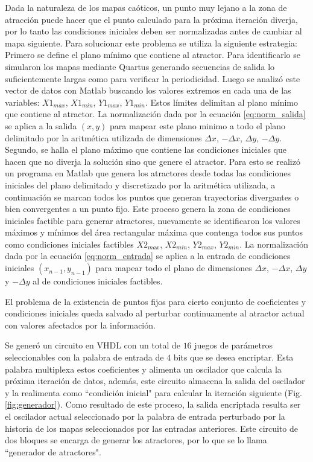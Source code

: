 Dada la naturaleza de los mapas caóticos, un punto muy lejano a la zona de atracción puede hacer que el punto calculado para la próxima iteración diverja, por lo tanto las condiciones iniciales deben ser normalizadas antes de cambiar al mapa siguiente. Para solucionar este problema se utiliza la siguiente estrategia:
 Primero se define el plano mínimo que contiene al atractor. Para
        identificarlo se simularon los mapas mediante Quartus
        generando secuencias de salida lo suficientemente largas como para
        verificar la periodicidad. Luego se analizó este vector de datos
        con Matlab buscando los valores extremos en cada una de las
        variables: $X1_{max}$, $X1_{min}$, $Y1_{max}$, $Y1_{min}$. Estos límites delimitan al plano mínimo que contiene al atractor. La normalización dada por la ecuación \ref{eq:norm_salida} se aplica a la salida $\left(x,y\right)$ para mapear este plano minimo a todo el plano delimitado por la aritmética utilizada de dimensiones $\Delta x$, $-\Delta x$, $\Delta y$, $-\Delta y$.
Segundo, se halla el plano máximo que contiene las condiciones
iniciales que hacen que no diverja la solución sino que genere el
atractor. Para esto se realizó un programa en Matlab que genera
los atractores desde todas las condiciones iniciales del plano
delimitado y discretizado por la aritmética utilizada, a
continuación se marcan todos los puntos que generan trayectorias
divergantes o bien convergentes a un punto fijo. Este proceso
genera la zona de condiciones iniciales factible para generar
atractores, nuevamente se identificaron los valores máximos y
mínimos del área rectangular máxima que contenga todos sus puntos
como condiciones iniciales factibles $X2_{max}$, $X2_{min}$,
$Y2_{max}$, $Y2_{min}$. La normalización dada por la ecuación
\ref{eq:norm_entrada} se aplica a la entrada de condiciones
iniciales $\left(x_{n-1},y_{n-1}\right)$ para mapear todo el plano
de dimensiones $\Delta x$, $-\Delta x$, $\Delta y$ y $-\Delta y$
al de condiciones iniciales factibles.


El problema de la existencia de puntos fijos para cierto conjunto de
coeficientes y condiciones iniciales queda salvado al perturbar
continuamente al atractor actual con valores afectados por la
información.

Se generó un circuito en VHDL con un total de $16$ juegos de
parámetros seleccionables con la palabra de entrada de $4$ bits
que se desea encriptar. Esta palabra multiplexa estos coeficientes
y alimenta un oscilador que calcula la próxima iteración de datos,
además, este circuito almacena la salida del oscilador y la
realimenta como ``condición inicial" para calcular la iteración
siguiente (Fig. \ref{fig:generador}). Como resultado de este
proceso, la salida encriptada resulta ser el oscilador actual
seleccionado por la palabra de entrada perturbado por la historia
de los mapas seleccionados por las entradas anteriores. Este
circuito de dos bloques se encarga de generar los atractores, por
lo que se lo llama ``generador de atractores".


